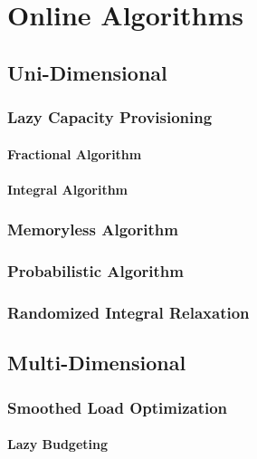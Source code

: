 
\chapter{Online Algorithms}\label{chapter:algorithms}

\section{Uni-Dimensional}

\subsection{Lazy Capacity Provisioning}

\subsubsection{Fractional Algorithm}

\subsubsection{Integral Algorithm}

\subsection{Memoryless Algorithm}

\subsection{Probabilistic Algorithm}

\subsection{Randomized Integral Relaxation}

\section{Multi-Dimensional}

\subsection{Smoothed Load Optimization}

\subsubsection{Lazy Budgeting}

